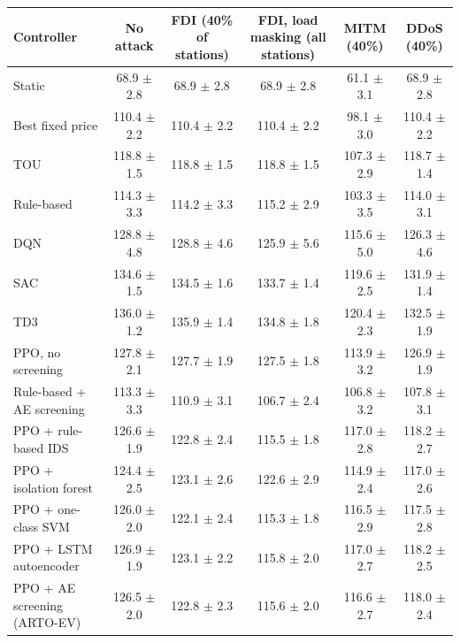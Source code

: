\begin{tabular}{@{}lccccc@{}}
\toprule
Controller & No attack & FDI (40\% of stations) & FDI, load masking (all stations) & MITM (40\%) & DDoS (40\%) \\
\midrule
Static & 68.9 $\pm$ 2.8 & 68.9 $\pm$ 2.8 & 68.9 $\pm$ 2.8 & 61.1 $\pm$ 3.1 & 68.9 $\pm$ 2.8 \\
Best fixed price & 110.4 $\pm$ 2.2 & 110.4 $\pm$ 2.2 & 110.4 $\pm$ 2.2 & 98.1 $\pm$ 3.0 & 110.4 $\pm$ 2.2 \\
TOU & 118.8 $\pm$ 1.5 & 118.8 $\pm$ 1.5 & 118.8 $\pm$ 1.5 & 107.3 $\pm$ 2.9 & 118.7 $\pm$ 1.4 \\
Rule-based & 114.3 $\pm$ 3.3 & 114.2 $\pm$ 3.3 & 115.2 $\pm$ 2.9 & 103.3 $\pm$ 3.5 & 114.0 $\pm$ 3.1 \\
DQN & 128.8 $\pm$ 4.8 & 128.8 $\pm$ 4.6 & 125.9 $\pm$ 5.6 & 115.6 $\pm$ 5.0 & 126.3 $\pm$ 4.6 \\
SAC & 134.6 $\pm$ 1.5 & 134.5 $\pm$ 1.6 & 133.7 $\pm$ 1.4 & 119.6 $\pm$ 2.5 & 131.9 $\pm$ 1.4 \\
TD3 & 136.0 $\pm$ 1.2 & 135.9 $\pm$ 1.4 & 134.8 $\pm$ 1.8 & 120.4 $\pm$ 2.3 & 132.5 $\pm$ 1.9 \\
PPO, no screening & 127.8 $\pm$ 2.1 & 127.7 $\pm$ 1.9 & 127.5 $\pm$ 1.8 & 113.9 $\pm$ 3.2 & 126.9 $\pm$ 1.9 \\
\midrule
Rule-based + AE screening & 113.3 $\pm$ 3.3 & 110.9 $\pm$ 3.1 & 106.7 $\pm$ 2.4 & 106.8 $\pm$ 3.2 & 107.8 $\pm$ 3.1 \\
PPO + rule-based IDS & 126.6 $\pm$ 1.9 & 122.8 $\pm$ 2.4 & 115.5 $\pm$ 1.8 & 117.0 $\pm$ 2.8 & 118.2 $\pm$ 2.7 \\
PPO + isolation forest & 124.4 $\pm$ 2.5 & 123.1 $\pm$ 2.6 & 122.6 $\pm$ 2.9 & 114.9 $\pm$ 2.4 & 117.0 $\pm$ 2.6 \\
PPO + one-class SVM & 126.0 $\pm$ 2.0 & 122.1 $\pm$ 2.4 & 115.3 $\pm$ 1.8 & 116.5 $\pm$ 2.9 & 117.5 $\pm$ 2.8 \\
PPO + LSTM autoencoder & 126.9 $\pm$ 1.9 & 123.1 $\pm$ 2.2 & 115.8 $\pm$ 2.0 & 117.0 $\pm$ 2.7 & 118.2 $\pm$ 2.5 \\
PPO + AE screening (ARTO-EV) & 126.5 $\pm$ 2.0 & 122.8 $\pm$ 2.3 & 115.6 $\pm$ 2.0 & 116.6 $\pm$ 2.7 & 118.0 $\pm$ 2.4 \\
\bottomrule
\end{tabular}
